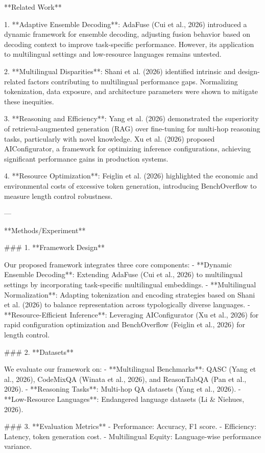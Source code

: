 **Related Work**

1. **Adaptive Ensemble Decoding**: AdaFuse (Cui et al., 2026) introduced a dynamic framework for ensemble decoding, adjusting fusion behavior based on decoding context to improve task-specific performance. However, its application to multilingual settings and low-resource languages remains untested.

2. **Multilingual Disparities**: Shani et al. (2026) identified intrinsic and design-related factors contributing to multilingual performance gaps. Normalizing tokenization, data exposure, and architecture parameters were shown to mitigate these inequities.

3. **Reasoning and Efficiency**: Yang et al. (2026) demonstrated the superiority of retrieval-augmented generation (RAG) over fine-tuning for multi-hop reasoning tasks, particularly with novel knowledge. Xu et al. (2026) proposed AIConfigurator, a framework for optimizing inference configurations, achieving significant performance gains in production systems.

4. **Resource Optimization**: Feiglin et al. (2026) highlighted the economic and environmental costs of excessive token generation, introducing BenchOverflow to measure length control robustness.

---

**Methods/Experiment**

### 1. **Framework Design**

Our proposed framework integrates three core components:
- **Dynamic Ensemble Decoding**: Extending AdaFuse (Cui et al., 2026) to multilingual settings by incorporating task-specific multilingual embeddings.
- **Multilingual Normalization**: Adapting tokenization and encoding strategies based on Shani et al. (2026) to balance representation across typologically diverse languages.
- **Resource-Efficient Inference**: Leveraging AIConfigurator (Xu et al., 2026) for rapid configuration optimization and BenchOverflow (Feiglin et al., 2026) for length control.

### 2. **Datasets**

We evaluate our framework on:
- **Multilingual Benchmarks**: QASC (Yang et al., 2026), CodeMixQA (Winata et al., 2026), and ReasonTabQA (Pan et al., 2026).
- **Reasoning Tasks**: Multi-hop QA datasets (Yang et al., 2026).
- **Low-Resource Languages**: Endangered language datasets (Li & Niehues, 2026).

### 3. **Evaluation Metrics**
- Performance: Accuracy, F1 score.
- Efficiency: Latency, token generation cost.
- Multilingual Equity: Language-wise performance variance.

